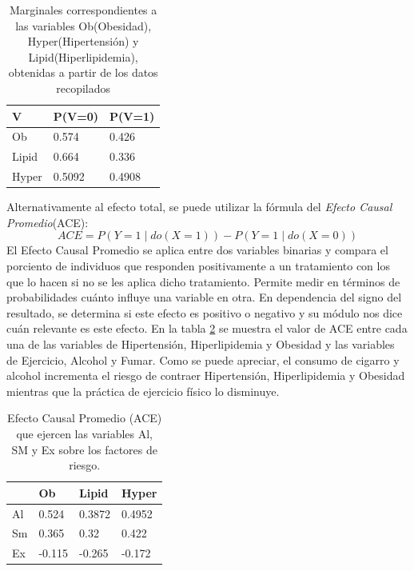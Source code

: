 \vspace*{20px}

\begin{table}
	\centering
	\begin{tabular}{| m{1cm} | m{1cm} | m{1cm}|}
		\hline
		V & P(V=0) & P(V=1)\\
		\hline
		Ob & 0.574 & 0.426 \\			
		\hline
		Lipid & 0.664 & 0.336 \\
		\hline
		Hyper & 0.5092 & 0.4908 \\
		\hline
	\end{tabular}
	\caption{Marginales correspondientes a las variables Ob(Obesidad), Hyper(Hipertensión) y Lipid(Hiperlipidemia), obtenidas a partir de los datos recopilados}
	\label{table:art-non-evidence}
\end{table}

Alternativamente al efecto total, se puede utilizar la fórmula del \textit{Efecto Causal Promedio}(ACE):
	\[ ACE = P(Y=1 \mid do(X=1)) - P(Y=1 \mid do(X=0)) \]
El Efecto Causal Promedio se aplica entre dos variables binarias y compara el porciento de individuos que responden positivamente a un tratamiento con los que lo hacen si no se les aplica dicho tratamiento. Permite medir en términos de probabilidades cuánto influye una variable en otra. En dependencia del signo del resultado, se determina si este efecto es positivo o negativo y su módulo nos dice cuán relevante es este efecto. En la tabla \ref{table:ace} se muestra el valor de ACE entre cada una de las variables de Hipertensión, Hiperlipidemia y Obesidad y las variables de Ejercicio, Alcohol y Fumar. Como se puede apreciar, el consumo de cigarro y alcohol incrementa el riesgo de contraer Hipertensión, Hiperlipidemia y Obesidad mientras que la práctica de ejercicio físico lo disminuye.

\begin{table}[h!]
	\centering
	\begin{tabular}{| m{1.2cm} | m{1.2cm} | m{1.2cm}| m{1.2cm} |}
		\hline
		& Ob & Lipid & Hyper \\
		\hline
		Al & 0.524 & 0.3872 & 0.4952 \\			
		\hline
		Sm & 0.365 & 0.32 & 0.422 \\
		\hline
		Ex & -0.115 & -0.265 & -0.172 \\
		\hline
	\end{tabular}
	\caption{Efecto Causal Promedio (ACE) que ejercen las variables Al, SM y Ex sobre los factores de riesgo.}
	\label{table:ace}
\end{table}

